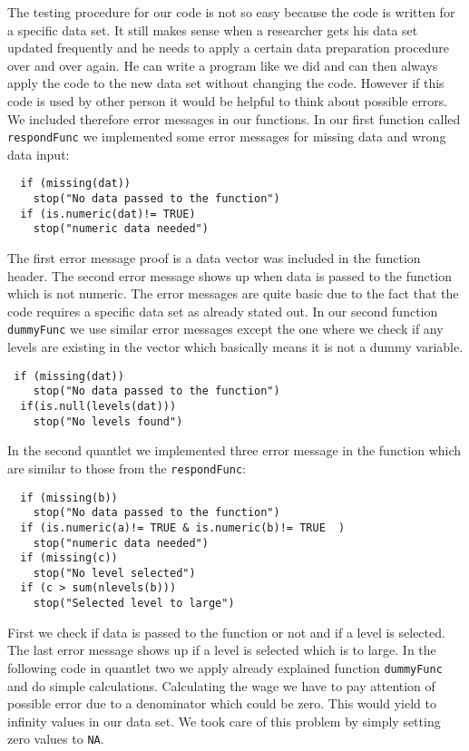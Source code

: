 The testing procedure for our code is not so easy because the code is written for a specific data set. It still makes sense when a researcher gets his data set updated frequently and he needs to apply a certain data preparation procedure over and over again. He can write a program like we did and can then always apply the code to the new data set without changing the code.
However if this code is used by other person it would be helpful to think about possible errors. We included therefore error messages in our functions. In our first function called \texttt{respondFunc} we implemented some error messages for missing data and wrong data input:
\lstset{firstnumber = 17}
\begin{lstlisting}
  if (missing(dat))
    stop("No data passed to the function")
  if (is.numeric(dat)!= TRUE)
    stop("numeric data needed")                       
\end{lstlisting}
The first error message proof is a data vector was included in the function header. The second error message shows up when data is passed to the function which is not numeric. The error messages are quite basic due to the fact that the code requires a specific data set as already stated out. In our second function \texttt{dummyFunc} we use similar error messages except the one where we check if any levels are existing in the vector which basically means it is not a dummy variable.
\lstset{firstnumber = 38}
\begin{lstlisting}
 if (missing(dat))
    stop("No data passed to the function")
  if(is.null(levels(dat)))
    stop("No levels found")                   
\end{lstlisting}

In the second quantlet we implemented three error message in the function which are similar to those from the \texttt{respondFunc}:
\lstset{firstnumber = 92}
\begin{lstlisting}
  if (missing(b))
    stop("No data passed to the function")
  if (is.numeric(a)!= TRUE & is.numeric(b)!= TRUE  )
    stop("numeric data needed")
  if (missing(c))
    stop("No level selected")
  if (c > sum(nlevels(b)))
    stop("Selected level to large")  
\end{lstlisting}
First we check if data is passed to the function or not and if a level is selected. The last error message shows up if a level is selected which is to large. In the following code in quantlet two we apply already explained function \texttt{dummyFunc} and do simple calculations. Calculating the wage we have to pay attention of possible error due to a denominator which could be zero. This would yield to infinity values in our data set. We took care of this problem by simply setting zero values to \texttt{NA}.

